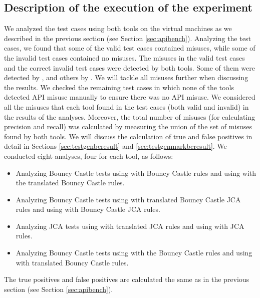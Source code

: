 \subsection{Description of the execution of the experiment}
We analyzed the test cases using both tools on the virtual machines as we described in the previous section (see Section \ref{sec:apibench}). Analyzing the test cases, we found that some of the valid test cases contained misuses, while some of the invalid test cases contained no misuses. The misuses in the valid test cases and the correct invalid test cases were detected by both tools. Some of them were detected by \cognicryptsast, and others by \codyze. We will tackle all misuses further when discussing the results. We checked the remaining test cases in which none of the tools detected API misuse manually to ensure there was no API misuse. We considered all the misuses that each tool found in the test cases (both valid and invalid) in the results of the analyses. Moreover, the total number of misuses (for calculating precision and recall) was calculated by measuring the union of the set of misuses found by both tools. We will discuss the calculation of true and false positives in detail in Sections \ref{sec:testgenbcresult} and \ref{sec:testgenmarkbcresult}.
We conducted eight analyses, four for each tool, as follows:
\begin{itemize}
  \item Analyzing Bouncy Castle tests using \codyze{} with Bouncy Castle \MARK{} rules and using \cognicryptsast{} with the translated Bouncy Castle \crysl{} rules.
  
  \item Analyzing Bouncy Castle tests using \codyze{} with translated Bouncy Castle JCA \MARK{} rules and using \cognicryptsast{} with Bouncy Castle JCA \crysl{} rules.
  
  \item Analyzing JCA tests using \codyze{} with translated JCA \MARK{} rules and using \cognicryptsast{} with JCA \crysl{} rules.
  
  \item Analyzing \MARK{} Bouncy Castle tests using \codyze{} with the Bouncy Castle \MARK{} rules and using \cognicryptsast{} with translated Bouncy Castle \crysl{} rules.

\end{itemize}
The true positives and false positives are calculated the same as in the previous section (see Section \ref{sec:apibench}).

